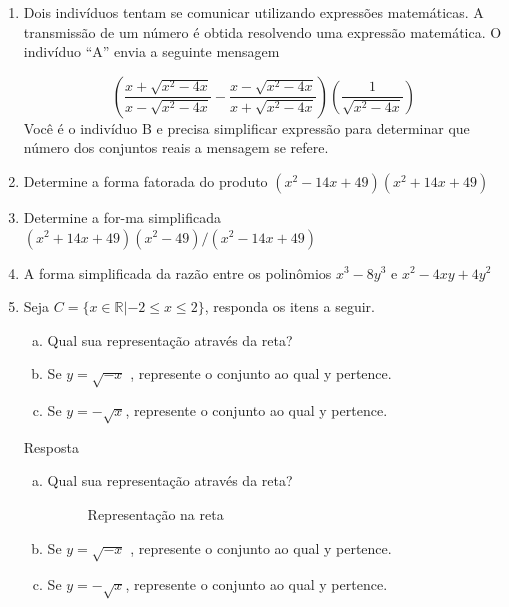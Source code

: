 \documentclass[12pt,onepage,a4paper]{memoir}
\begin{document}
\begin{enumerate}
      

          \item  Dois indivíduos tentam se comunicar utilizando expressões matemáticas. A transmissão de um número é obtida resolvendo uma expressão matemática. O indivíduo “A” envia a seguinte mensagem 

\begin{equation}
  \left( \frac{x + \sqrt{x^2-4x}}{x - \sqrt{x^2-4x}}  - \frac{x - \sqrt{x^2-4x}}{x + \sqrt{x^2-4x}} \right)\left( \frac{1}{\sqrt{x^2-4x}}\right)
\end{equation}
Você é o indivíduo B e precisa simplificar expressão para determinar que número
dos conjuntos reais a mensagem se refere.

\item Determine a forma fatorada do produto $(x^2 - 14x + 49 )(x^2 + 14x + 49 )$
\item Determine a for-ma simplificada $(x^2 + 14x + 49)( x^2 - 49)/(x^2 - 14x +
  49)$
  \item  A forma simplificada da razão entre os polinômios $x^3 - 8y^3$ e $x^2 -
    4xy + 4y^2$

  \item Seja $C=\{ x \in \mathbb{R} | -2 \leq x \leq 2  \}$, responda os itens a seguir.  

    \begin{enumerate}[a)]
    \item  Qual sua representação através da reta?
    \item  Se $y = \sqrt{-x}$ , represente o conjunto ao qual y pertence.
    \item Se $y = -\sqrt{x}$, represente o conjunto ao qual y pertence.
    \end{enumerate}

Resposta

       \begin{enumerate}[a)]
       \item  Qual sua representação através da reta?


         \begin{figure}
           \centering
           \caption{Representação na reta}
         \end{figure}
         
    \item  Se $y = \sqrt{-x}$ , represente o conjunto ao qual y pertence.
    \item Se $y = -\sqrt{x}$, represente o conjunto ao qual y pertence.
    \end{enumerate}
\end{enumerate} %
\end{document}
